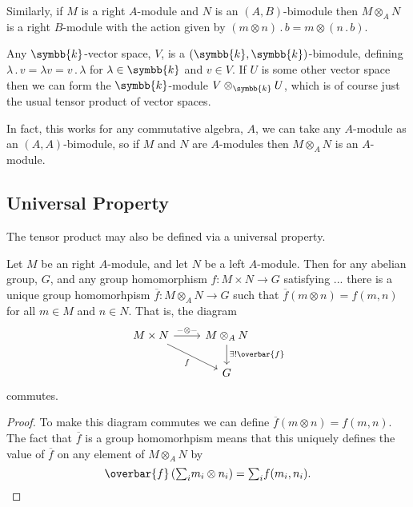 \documentclass[fleqn]{NotesClass}
\renewcommand{\field}{\symbb{k}}
\newcommand{\action}{\mathbin{.}}
\begin{document}
    Similarly, if \(M\) is a right \(A\)-module and \(N\) is an \((A, B)\)-bimodule then \(M \otimes_A N\) is a right \(B\)-module with the action given by \((m \otimes n) \action b = m \otimes (n \action b)\).
    
    \begin{exm}{}{}
        Any \(\field\)-vector space, \(V\), is a \((\field, \field)\)-bimodule, defining \(\lambda \action v = \lambda v = v \action \lambda\) for \(\lambda \in \field\) and \(v \in V\).
        If \(U\) is some other vector space then we can form the \(\field\)-module \(V \otimes_{\field} U\), which is of course just the usual tensor product of vector spaces.
        
        In fact, this works for any commutative algebra, \(A\), we can take any \(A\)-module as an \((A, A)\)-bimodule, so if \(M\) and \(N\) are \(A\)-modules then \(M \otimes_A N\) is an \(A\)-module.
    \end{exm}
    
    \subsection{Universal Property}
    The tensor product may also be defined via a universal property.
    
    \begin{lma}{}{}
        Let \(M\) be an right \(A\)-module, and let \(N\) be a left \(A\)-module.
        Then for any abelian group, \(G\), and any group homomorphism \(f \colon M \times N \to G\) satisfying ... there is a unique group homomorhpism \(\overbar{f} \colon M \otimes_A N \to G\) such that \(\overbar{f}(m \otimes n) = f(m, n)\) for all \(m \in M\) and \(n \in N\).
        That is, the diagram
        \begin{equation}
            \begin{tikzcd}
                M \times N \arrow[r, "{-}\otimes{-}"] \arrow[dr, "f"'] & M \otimes_A N \arrow[d, "\exists ! \overbar{f}"]\\
                & G
            \end{tikzcd}
        \end{equation}
        commutes.
        \begin{proof}
            To make this diagram commutes we can define \(\overbar{f}(m \otimes n) = f(m, n)\).
            The fact that \(\overbar{f}\) is a group homomorhpism means that this uniquely defines the value of \(\overbar{f}\) on any element of \(M \otimes_A N\) by
            \begin{equation}
                \overbar{f}\left( {\textstyle \sum_i} m_i \otimes n_i \right) = {\textstyle\sum_i} f(m_i, n_i). \qedhere
            \end{equation}
        \end{proof}
    \end{lma}
    
\end{document}
